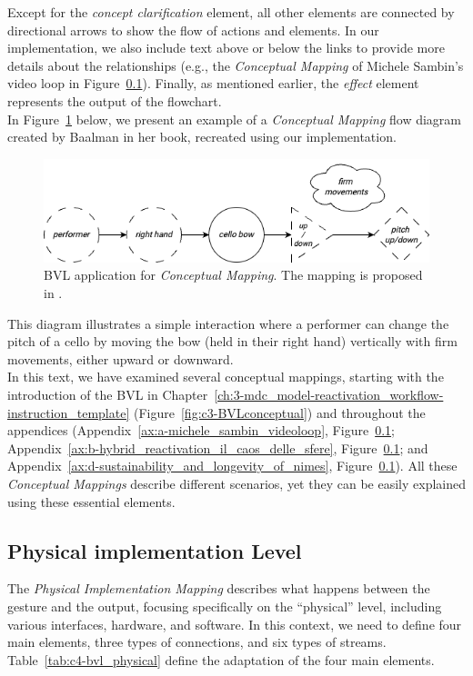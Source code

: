 Except for the \textit{concept clarification} element, all other elements are connected by directional arrows to show the flow of actions and elements. In our implementation, we also include text above or below the links to provide more details about the relationships (e.g., the \textit{Conceptual Mapping} of Michele Sambin’s video loop in Figure~\ref{}). Finally, as mentioned earlier, the \textit{effect} element represents the output of the flowchart.\\
In Figure~\ref{fig:c4-conceptual_level} below, we present an example of a \textit{Conceptual Mapping} flow diagram created by Baalman in her book, recreated using our implementation.
\begin{figure}[!h]
    \centering
    \includegraphics[width=1\linewidth]{chapters/4-MDC_model_application/image/bvl-conceptual_level.png}
    \caption{BVL application for \textit{Conceptual Mapping}. The mapping is proposed in \cite{baalman2022composing}.}
    \label{fig:c4-conceptual_level}
\end{figure}
This diagram illustrates a simple interaction where a performer can change the pitch of a cello by moving the bow (held in their right hand) vertically with firm movements, either upward or downward.\\
In this text, we have examined several conceptual mappings, starting with the introduction of the BVL in Chapter~\ref{ch:3-mdc_model-reactivation_workflow-instruction_template} (Figure~\ref{fig:c3-BVLconceptual}) and throughout the appendices (Appendix~\ref{ax:a-michele_sambin_videoloop}, Figure~\ref{}; Appendix~\ref{ax:b-hybrid_reactivation_il_caos_delle_sfere}, Figure~\ref{}; and Appendix~\ref{ax:d-sustainability_and_longevity_of_nimes}, Figure~\ref{}). All these \textit{Conceptual Mappings} describe different scenarios, yet they can be easily explained using these essential elements.

\subsection{Physical implementation Level}
The \textit{Physical Implementation Mapping} describes what happens between the gesture and the output, focusing specifically on the ``physical'' level, including various interfaces, hardware, and software. In this context, we need to define four main elements, three types of connections, and six types of streams. Table~\ref{tab:c4-bvl_physical} define the adaptation of the four main elements.


